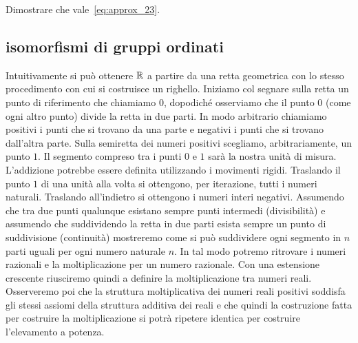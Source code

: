 \begin{exercise}
Dimostrare che vale~\eqref{eq:approx_23}.
\end{exercise}  

  
\subsection{isomorfismi di gruppi ordinati}

Intuitivamente si può ottenere ${\mathbb R}$ a partire da una retta geometrica 
con lo stesso procedimento con cui si costruisce un righello.
Iniziamo col segnare
sulla retta un punto di riferimento che chiamiamo $0$, 
dopodiché osserviamo che
il punto $0$ (come ogni altro punto) divide la retta in due parti. In modo arbitrario
chiamiamo positivi i punti che si trovano da una parte e negativi i punti che
si trovano dall'altra parte. Sulla semiretta dei numeri positivi scegliamo, arbitrariamente,
un punto $1$. Il segmento compreso tra i punti $0$ e $1$ sarà la nostra unità di
misura.
L'addizione potrebbe essere definita utilizzando i movimenti rigidi.
Traslando il punto $1$ di una unità alla volta si ottengono, per iterazione, tutti i numeri naturali.
Traslando all'indietro si ottengono i numeri interi negativi. 
Assumendo che tra due punti qualunque esistano sempre punti intermedi (divisibilità) e
assumendo che suddividendo la retta in due parti esista sempre un punto di 
suddivisione (continuità) mostreremo come si può suddividere 
ogni segmento in $n$ parti uguali per ogni numero naturale $n$. 
In tal modo potremo ritrovare i numeri razionali e la moltiplicazione per un numero razionale.
Con una estensione crescente riusciremo quindi a definire la moltiplicazione 
tra numeri reali. 
Osserveremo poi che la struttura moltiplicativa dei numeri reali positivi soddisfa 
gli stessi assiomi della struttura additiva dei reali e che quindi la costruzione fatta 
per costruire la moltiplicazione si potrà ripetere identica per costruire l'elevamento a potenza.

